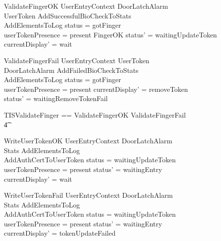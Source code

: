 \begin{schema}{ValidateFingerOK}
	UserEntryContext
\also
	\Xi DoorLatchAlarm
\\      \Xi UserToken
\also
        AddSuccessfulBioCheckToStats
\\      AddElementsToLog
\where
	status = gotFinger
\\      userTokenPresence = present
\also
        FingerOK
\also
	status' = waitingUpdateToken
\\	currentDisplay' = wait
\end{schema}

\begin{schema}{ValidateFingerFail}
        UserEntryContext
\also
	\Xi UserToken
\\      \Xi DoorLatchAlarm
\also      
        AddFailedBioCheckToStats
\\      AddElementsToLog
\where
        status = gotFinger
\\      userTokenPresence = present
\also
        currentDisplay' = removeToken
\\      status' = waitingRemoveTokenFail
\end{schema}

\begin{zed}
        TISValidateFinger == ValidateFingerOK \lor ValidateFingerFail
\\ \t4  \lor [~ UserTokenTorn | status = gotFinger ~]
\end{zed}

\begin{schema}{WriteUserTokenOK}
	UserEntryContext
\also
	\Xi DoorLatchAlarm
\\      \Xi Stats
\also
        AddElementsToLog
\\      AddAuthCertToUserToken
\where
	status = waitingUpdateToken
\\      userTokenPresence = present
\also
        status' = waitingEntry
\\      currentDisplay' = wait
\end{schema}

\begin{schema}{WriteUserTokenFail}
	UserEntryContext
\also
	\Xi DoorLatchAlarm
\\      \Xi Stats
\also
        AddElementsToLog
\\      AddAuthCertToUserToken
\where
	status = waitingUpdateToken
\\      userTokenPresence = present
\also
        status' = waitingEntry
\\      currentDisplay' = tokenUpdateFailed
\end{schema}

